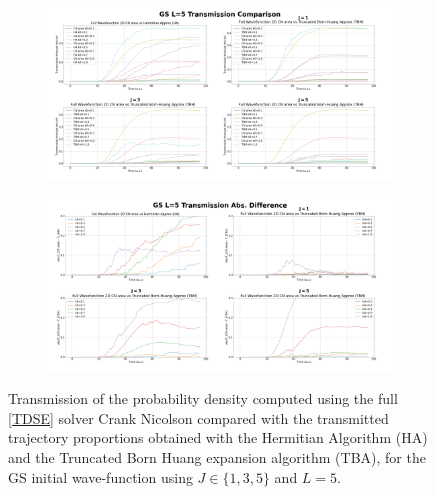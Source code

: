 \documentclass[11pt, a4paper]{article} %
\begin{document}
\begin{figure}[p]
  \centering
  \begin{subfigure}[b]{1.1\linewidth}
    \includegraphics[width=\linewidth]{Example_Results/GS_L_5_transmission.png}
  \end{subfigure}
  \begin{subfigure}[b]{1.1\linewidth}
    \includegraphics[width=\linewidth]{Example_Results/GS_L_5_errors.png}
  \end{subfigure}

  
  \caption{ Transmission of the probability density computed using the full \ref{TDSE} solver Crank Nicolson compared with the transmitted trajectory proportions obtained with the Hermitian Algorithm (HA) and the Truncated Born Huang expansion algorithm (TBA), for the GS initial wave-function using $J\in\{1,3,5\}$ and $L=5$. }
  \label{fig:transm_GS_L5}
\end{figure}
\end{document}
